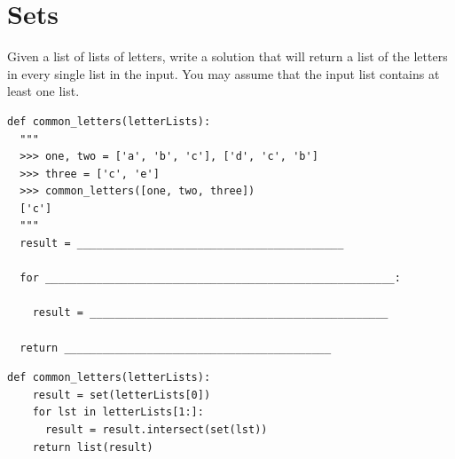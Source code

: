 \documentclass{exam}
\begin{document}

\section{Sets}
\begin{questions}

\item Given a list of lists of letters, write a solution that will return a list of the letters in every single list in the input. You may assume that the input list contains at least one list.
\newline
\begin{lstlisting}
def common_letters(letterLists):
  """
  >>> one, two = ['a', 'b', 'c'], ['d', 'c', 'b']
  >>> three = ['c', 'e']
  >>> common_letters([one, two, three])
  ['c']
  """
  result = __________________________________________

  for _______________________________________________________:

    result = _______________________________________________

  return __________________________________________
\end{lstlisting}
\begin{solution}
\begin{lstlisting}
def common_letters(letterLists):
    result = set(letterLists[0])
    for lst in letterLists[1:]:
      result = result.intersect(set(lst))
    return list(result)
\end{lstlisting}
\end{solution}
\end{questions}


\end{document}
